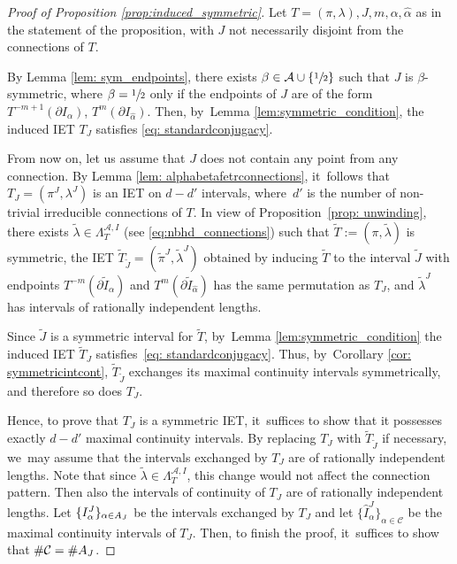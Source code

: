 \documentclass[10pt,a4paper]{amsart}
\theoremstyle{plain}
\theoremstyle{definition}
\newcommand{\A}{\mathcal{A}}
\begin{document}
\begin{proof}[Proof of Proposition \ref{prop:induced_symmetric}]
Let $T = (\pi, \lambda), J, m, \alpha, \hat \alpha$ as in the statement of the proposition, with $J$ not necessarily disjoint from the connections of $T$.

By Lemma \ref{lem: sym_endpoints}, there exists $\beta \in \A \cup \{\sfrac{1}{2}\}$ such that $J$ is $\beta$-symmetric, where $\beta = \sfrac{1}{2}$ only if the endpoints of $J$ are of the form $T^{-m + 1}(\partial I_\alpha)$, $T^m(\partial I_{\hat \alpha})$. Then, by~Lemma \ref{lem:symmetric_condition}, the induced IET $T_J$ satisfies \eqref{eq: standardconjugacy}.

From now on, let us assume that $J$ does not contain any point from any connection.
By Lemma \ref{lem: alphabetafetrconnections}, it~follows that $T_J = (\pi^J, \lambda^J)$ is an IET on $d - d'$ intervals, where~$d'$ is the number of non-trivial irreducible connections of $T$. In view of Proposition~\ref{prop: unwinding}, there exists $\tilde\lambda\in\Lambda^{\mathcal A,I}_T$ (see \eqref{eq:nbhd_connections}) such that $\tilde{T}:=(\pi,\tilde\lambda)$ is symmetric, the IET $\tilde{T}_{\tilde J} = (\tilde \pi^J, \tilde \lambda^J)$ obtained by inducing $\tilde{T}$ to the interval $\tilde J$ with endpoints $T^{-m}(\partial \tilde I_{\alpha})$ and $T^{m}(\partial \tilde I_{\hat\alpha})$ has the same permutation as $T_J$, and $\tilde\lambda^J$ has intervals of rationally independent lengths.

Since $\tilde J$ is a symmetric interval for $\tilde T$, by~Lemma \ref{lem:symmetric_condition} the induced IET $\tilde T_J$ satisfies~\eqref{eq: standardconjugacy}. Thus, by~Corollary \ref{cor: symmetricintcont}, $\tilde{T}_{\tilde J}$ exchanges its maximal continuity intervals symmetrically, and therefore so does $T_J$.

Hence, to prove that $T_J$ is a symmetric IET, it~suffices to show that it possesses exactly $d - d'$ maximal continuity intervals. By replacing $T_J$ with $\tilde{T}_{\tilde J}$ if necessary, we~may assume that the intervals exchanged by $T_{J}$ are of rationally independent lengths. Note that since $\tilde\lambda\in\Lambda^{\mathcal A,I}_T$, this change would not affect the connection pattern. Then also the intervals of continuity of $T_J$ are of rationally independent lengths. Let $\{I^J_{\alpha}\}_{\alpha\in\mathcal \A_J}$ be the intervals exchanged by $T_J$ and let $\{\hat I^J_{\alpha}\}_{\alpha\in\mathcal C}$ be the maximal continuity intervals of $T_J$. Then, to finish the proof, it~suffices to show that $\#\mathcal C = \#\mathcal \A_J$.


\end{proof}
\end{document}
